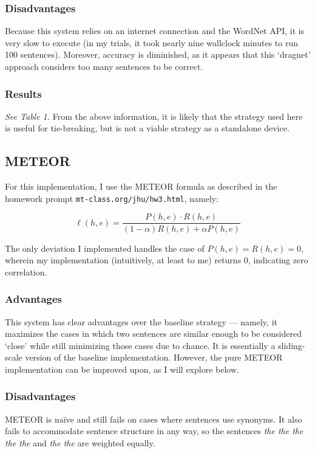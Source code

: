 \documentclass{article}
\begin{document}
\subsubsection{Disadvantages}
Because this system relies on an internet connection and the WordNet API, it is very slow to execute (in my trials, it took nearly nine wallclock minutes to run 100 sentences). Moreover, accuracy is diminished, as it appears that this `dragnet' approach considers too many sentences to be correct.

\subsubsection{Results}
\textit{See Table 1.}  From the above information, it is likely that the strategy used here is useful for tie-breaking, but is not a viable strategy as a standalone device.

\subsection{METEOR}
For this implementation, I use the METEOR formula as described in the homework prompt \texttt{mt-class.org/jhu/hw3.html}, namely:

$$\displaystyle \ell(h,e) = \frac{P(h,e) \cdot R(h,e)}{(1-\alpha)R(h,e) + \alpha P(h,e)}$$

The only deviation I implemented handles the case of $P(h,e) = R(h,e) = 0$, wherein my implementation (intuitively, at least to me) returns $0$, indicating zero correlation.

\subsubsection{Advantages}
This system has clear advantages over the baseline strategy — namely, it maximizes the cases in which two sentences are similar enough to be considered `close' while still minimizing those cases due to chance. It is essentially a sliding-scale version of the baseline implementation. However, the pure METEOR implementation can be improved upon, as I will explore below.

\subsubsection{Disadvantages}
METEOR is naïve and still fails on cases where sentences use synonyms. It also fails to accommodate sentence structure in any way, so the sentences \textit{the the the the the} and \textit{the the} are weighted equally.
\end{document}
